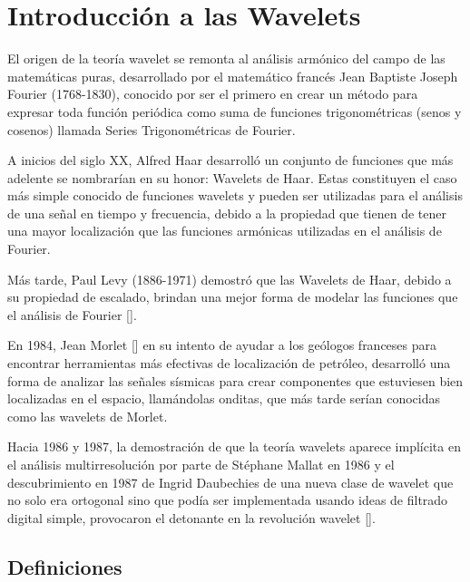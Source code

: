 \section{Introducci\'on a las Wavelets}

\par El origen de la teor\'ia wavelet se remonta al an\'alisis arm\'onico del campo de las matem\'aticas puras, desarrollado por el matem\'atico franc\'es Jean Baptiste Joseph Fourier (1768-1830), conocido por ser el primero en crear un m\'etodo para expresar toda funci\'on peri\'odica como suma de funciones trigonom\'etricas (senos y cosenos) llamada Series Trigonom\'etricas de Fourier.

\par A inicios del siglo XX, Alfred Haar desarroll\'o un conjunto de funciones que m\'as adelente se nombrar\'ian en su honor: Wavelets de Haar. Estas constituyen el caso m\'as simple conocido de funciones wavelets y pueden ser utilizadas para el an\'alisis de una se\~nal en tiempo y frecuencia, debido a la propiedad que tienen de tener una mayor localizaci\'on que las funciones arm\'onicas utilizadas en el an\'alisis de Fourier.

\par M\'as tarde, Paul Levy (1886-1971) demostr\'o que las Wavelets de Haar, debido a su propiedad de escalado, brindan una mejor forma de modelar las funciones que el an\'alisis de Fourier [\textcolor{cyan}{\cite{6}}].

\par En 1984, Jean Morlet [\cite{21}] en su intento de ayudar a los ge\'ologos franceses para encontrar herramientas m\'as efectivas de localizaci\'on de petr\'oleo, desarroll\'o una forma de analizar las se\~nales s\'ismicas para crear componentes que estuviesen bien localizadas en el espacio, llam\'andolas onditas, que m\'as tarde ser\'ian conocidas como las wavelets de Morlet.

\par Hacia 1986 y 1987, la demostraci\'on de que la teor\'ia wavelets aparece impl\'icita en el an\'alisis multirresoluci\'on por parte de Stéphane Mallat en 1986 y el descubrimiento en 1987 de Ingrid Daubechies de una nueva clase de wavelet que no solo era ortogonal sino que pod\'ia ser implementada usando ideas de filtrado digital simple, provocaron el detonante en la revoluci\'on wavelet [\textcolor{cyan}{\cite{7}}].

\subsection{Definiciones}


